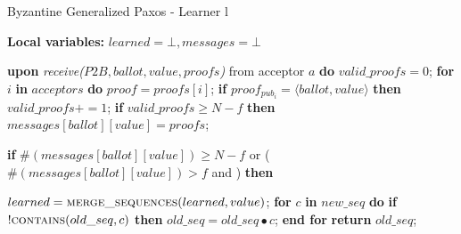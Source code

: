 \begin{algorithm}
	\caption{Byzantine Generalized Paxos - Learner l}
	\label{BFT-Learn}
	\textbf{Local variables:} $learned = \bot, messages = \bot$
	\begin{algorithmic}[1]			
		\State \textbf{upon} \textit{receive($P2B, ballot, value, proofs$)} from acceptor $a$ \textbf{do}
		\State \hspace{\algorithmicindent} $valid\_proofs = 0$;
		\State \hspace{\algorithmicindent} \textbf{for} $i$ \textbf{in} $acceptors$ \textbf{do}
		\State \hspace{\algorithmicindent}\hspace{\algorithmicindent} $proof = proofs[i]$;
		\State \hspace{\algorithmicindent}\hspace{\algorithmicindent} \textbf{if} $proof_{pub_i} = \langle ballot, value \rangle$ \textbf{then}
		\State \hspace{\algorithmicindent}\hspace{\algorithmicindent}\hspace{\algorithmicindent} 
		$valid\_proofs \mathrel{+{=}} 1$;
		\State
		\State \hspace{\algorithmicindent} \textbf{if} $valid\_proofs \geq N-f$ \textbf{then}
		\State \hspace{\algorithmicindent}\hspace{\algorithmicindent} $messages[ballot][value] = proofs$;
		\State
		\State \hspace{\algorithmicindent}\hspace{\algorithmicindent}
		\parbox{\linewidth}{\textbf{if} $\#(messages[ballot][value]) \geq N-f$ or ($\#(messages[ballot][value]) > f$ and ) \textbf{then}}
		\State \hspace{\algorithmicindent}\hspace{\algorithmicindent}\hspace{\algorithmicindent} $learned = \Call{merge\_sequences}{learned, value}$;
		\State		
		\State \textbf{for} $c$ \textbf{in} $new\_seq$ \textbf{do} 
		\State \hspace{\algorithmicindent} \textbf{if} $!\Call{contains}{old\_seq,c}$ \textbf{then}
		\State \hspace{\algorithmicindent}\hspace{\algorithmicindent}\hspace{\algorithmicindent} $old\_seq =  old\_seq \bullet c$;
		\State \textbf{end for}
		\State \textbf{return} $old\_seq$;
		\EndFunction
	\end{algorithmic}
\end{algorithm}


